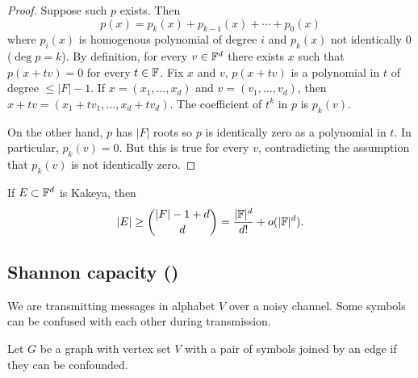 \begin{proof}	
Suppose such $p$ exists. Then
\[
p(x) = p_k(x) + p_{k-1}(x) + \dotsm + p_0(x)
\]
where $p_i(x)$ is homogenous polynomial of degree $i$ and $p_k(x)$ not identically $0$ ($\deg p = k$).
By definition, for every $v\in \mathbb{F}^d$ there exists $x$ such that $p(x+tv) =0$ for every $t\in \mathbb{F}$. Fix $x$ and $v$, $p(x+tv)$ is a polynomial in $t$ of degree $\leq |F| - 1$. If $x= ( x_1,\dotsc,x_d)$ and $v = ( v_1,\dotsc,v_d)$, then $x+tv = (x_1+tv_1,\dotsc,x_d+ tv_d)$. The coefficient of $t^k$ in $p$ is $p_k(v)$.

On the other hand, $p$ has $|F|$ roots so $p$ is identically zero as a polynomial in $t$. In particular, $p_k(v) = 0$. But this is true for every $v$, contradicting the assumption that $p_k(v) $ is not identically zero.
\end{proof}

\begin{corollary}
If $E\subset \mathbb{F}^d$ is Kakeya, then
\[
|E| \geq {|F| - 1 + d \choose d} = \frac{|\mathbb{F}|^d}{d!} + o(|\mathbb{F}|^d).
\]
\end{corollary}



\subsection{Shannon capacity (\cite{shannonGraph})}
We are transmitting messages in alphabet $V$ over a noisy channel. Some symbols can be confused with each other during transmission.

Let $G$ be a graph with vertex set $V$ with a pair of symbols joined by an edge if they can be confounded. 

